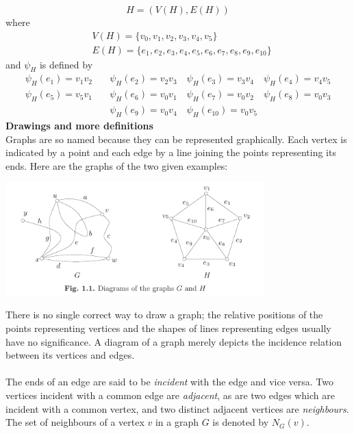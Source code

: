 \documentclass{report}
\theoremstyle{definition}
\begin{document}
\begin{equation*}
H=(V(H),E(H))
\end{equation*}
where
\begin{align*}
&V(H)=\{v_0,v_1,v_2,v_3,v_4,v_5\}\\
&E(H)=\{e_1,e_2,e_3,e_4,e_5,e_6,e_7,e_8,e_9,e_{10}\}
\end{align*}
and $\psi_H$ is defined by
\begin{align*}
\psi_H(e_1)=v_1v_2\quad&\psi_H(e_2)=v_2v_3\quad\psi_H(e_3)=v_3v_4\quad\psi_H(e_4)=v_4v_5\\
\psi_H(e_5)=v_5v_1\quad&\psi_H(e_6)=v_0v_1\quad\psi_H(e_7)=v_0v_2\quad\psi_H(e_8)=v_0v_3\\
&\psi_H(e_9)=v_0v_4\quad\psi_H(e_{10})=v_0v_5
\end{align*}
\textbf{Drawings and more definitions}\\
Graphs are so named because they can be represented graphically. Each vertex is indicated by a point and each edge by a line joining the points representing its ends. Here are the graphs of the two
given examples:
\begin{center}
\includegraphics[width=10cm]{1}\\
\end{center}
There is no single correct way to draw a graph; the relative positions of the points representing vertices and the shapes of lines representing edges usually have no significance. A diagram of
a graph merely depicts the incidence relation between its vertices and edges.\\
\vspace{1mm}\\
The ends of an edge are said to be \textit{incident} with the edge and vice versa. Two vertices incident with a common edge are \textit{adjacent}, as are two edges which are incident with a 
common vertex, and two distinct adjacent vertices are \textit{neighbours}. The set of neighbours of a vertex $v$ in a graph $G$ is denoted by $N_G(v)$.\\
\vspace{1mm}\\
\end{document}
